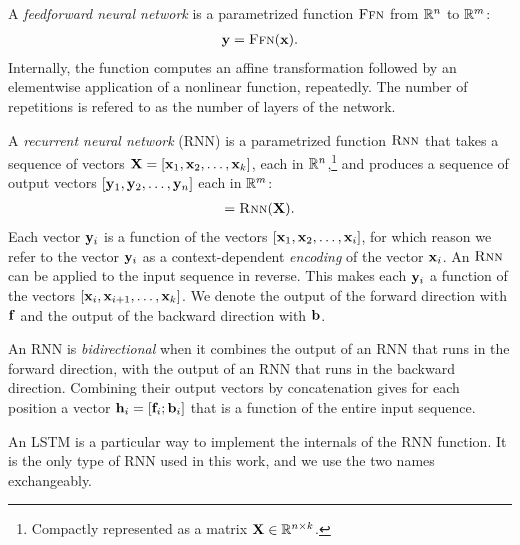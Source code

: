   \begin{definition}{} A \textit{feedforward neural network} is a parametrized function $\textsc{Ffn}$ from $\mathbb{R}^{n}$ to $\mathbb{R}^{m}$:
  \begin{align*}
    \mathbf{y} = \textsc{Ffn}( \mathbf{x} ).
  \end{align*}
  Internally, the function computes an affine transformation followed by an elementwise application of a nonlinear function, repeatedly. The number of repetitions is refered to as the number of layers of the network.
  \end{definition}

  \begin{definition}{} A \textit{recurrent neural network} (RNN) is a parametrized function $\textsc{Rnn}$ that takes a sequence of vectors $\mathbf{X} = [ \mathbf{x}_1, \mathbf{x}_2, \dots, \mathbf{x}_k ]$, each in $\mathbb{R}^{n}$,\footnote{Compactly represented as a matrix $\mathbf{X} \in \mathbb{R}^{n \times k}$.} and produces a sequence of output vectors $[\mathbf{y}_1, \mathbf{y}_2, \dots,\mathbf{y}_n]$ each in $\mathbb{R}^{m}$:
  \begin{align*}
    [\vecy_1, \vecy_2, \dots, \vecy_k] = \rnn( \mathbf{X} ).
  \end{align*}
  Each vector $\mathbf{y}_i$ is a function of the vectors $[\mathbf{x}_1, \mathbf{x}_2, \dots, \mathbf{x}_i ]$, for which reason we refer to the vector $\mathbf{y}_i$ as a context-dependent \textit{encoding} of the vector $\mathbf{x}_i$. An $\textsc{Rnn}$ can be applied to the input sequence in reverse. This makes each $\mathbf{y}_i$ a function of the vectors $[\mathbf{x}_i, \mathbf{x}_{i+1}, \dots, \mathbf{x}_k ]$. We denote the output of the forward direction with $\mathbf{f}$ and the output of the backward direction with $\mathbf{b}$.
  \end{definition}

  \begin{definition}{} An RNN is \textit{bidirectional} when it combines the output of an RNN that runs in the forward direction, with the output of an RNN that  runs in the backward direction. Combining their output vectors by concatenation gives for each position a vector $\mathbf{h}_i = [ \mathbf{f}_i; \mathbf{b}_i ]$ that is a function of the entire input sequence.
  \end{definition}

  \begin{definition}{} An LSTM \citep{hochreiter1997long} is a particular way to implement the internals of the RNN function. It is the only type of RNN used in this work, and we use the two names exchangeably.
  \end{definition}


